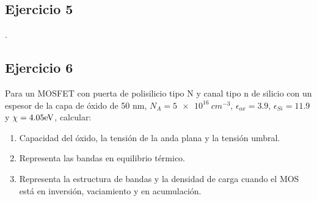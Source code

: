 \vspace*{2em}

\begin{Enunciado}
	\subsection*{Ejercicio 5}

	\lipsum[1].
\end{Enunciado}

\vspace*{1em}

\lipsum[1]

\vspace*{2em}


\begin{Enunciado}
	\subsection*{Ejercicio 6}
	Para un MOSFET con puerta de polisilicio tipo N y canal tipo n de silicio con un espesor de la capa de óxido de 50 nm, $N_A = \SI{5e16}{cm^{-3}}$, $\epsilon_{ox}=3.9$, $\epsilon_{Si} = 11.9$ y $\chi=4.05 \text{eV}$, calcular:
	\begin{enumerate}[label=\alph*)]
		\item Capacidad del óxido, la tensión de la anda plana y la tensión umbral.
		\item Representa las bandas en equilibrio térmico.
		\item Representa la estructura de bandas y la densidad de carga cuando el MOS está en inversión, vaciamiento y en acumulación.
	\end{enumerate}
\end{Enunciado}

